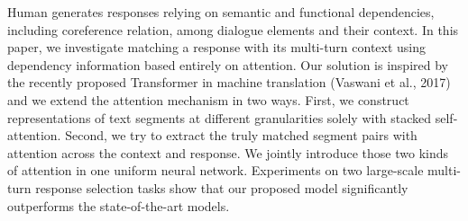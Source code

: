 Human generates responses relying on semantic and functional dependencies, including coreference relation, among dialogue elements and their context. In this paper, we investigate matching a response with its multi-turn context using dependency information based entirely on attention. Our solution is inspired by the recently proposed Transformer in machine translation (Vaswani et al., 2017) and we extend the attention mechanism in two ways. First, we construct representations of text segments at different granularities solely with stacked self-attention. Second, we try to extract the truly matched segment pairs with attention across the context and response. We jointly introduce those two kinds of attention in one uniform neural network. Experiments on two large-scale multi-turn response selection tasks show that our proposed model significantly outperforms the state-of-the-art models.
